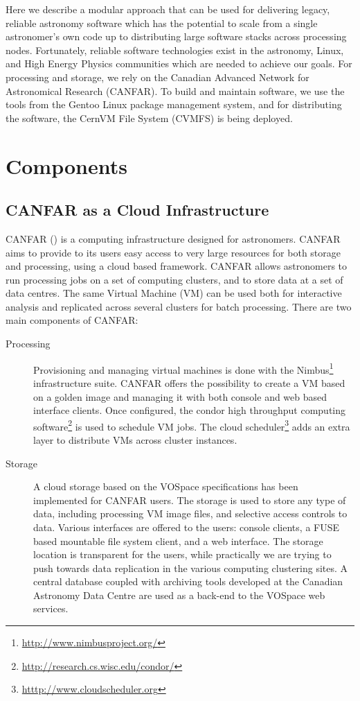 Here we describe a modular approach that can be used for
delivering legacy, reliable astronomy software which has the potential
to scale from a single astronomer's own code up to distributing large
software stacks across processing nodes. Fortunately, reliable
software technologies exist in the astronomy,
Linux, and High Energy Physics communities which are needed to achieve our goals. For
processing and storage, we rely on the Canadian Advanced Network for
Astronomical Research (CANFAR). To build and maintain software, we use the tools
from the Gentoo Linux package management system, and for distributing the
software, the CernVM File System (CVMFS) is being deployed.

\section{Components}
\subsection{CANFAR as a Cloud Infrastructure}
CANFAR (\cite{canfar}) is a computing infrastructure designed for
astronomers. CANFAR aims to provide to its users easy access to very
large resources for both storage and processing, using a cloud based
framework. CANFAR allows astronomers to run processing jobs on a set
of computing clusters, and to store data at a set of data centres. The
same Virtual Machine (VM) can be used both for interactive analysis
and replicated across several clusters for batch processing.
There are two main components of CANFAR:
\begin{description}
\item[Processing] Provisioning and managing virtual machines is done
  with the Nimbus\footnote{\url{http://www.nimbusproject.org/}}
  infrastructure suite. CANFAR offers the possibility
  to create a VM based on a golden image and managing it with both
  console and web based interface clients. Once configured,
  the condor high throughput computing software\footnote{\url{http://research.cs.wisc.edu/condor/}} is used to
  schedule VM jobs. The cloud scheduler\footnote{\url{htttp://www.cloudscheduler.org}} adds
  an extra layer to distribute VMs across cluster instances.
\item[Storage] A cloud storage based on the VOSpace specifications has
  been implemented for CANFAR users. The storage is used to store any
  type of data, including processing VM image files, and selective
  access controls to data. Various interfaces are offered to the
  users: console clients, a FUSE based mountable file system client,
  and a web interface. The storage location is transparent for
  the users, while practically we are trying to push towards data
  replication in the various computing clustering sites. A central
  database coupled with archiving tools developed at the Canadian
  Astronomy Data Centre are used as a back-end to the VOSpace web services.
\end{description}

